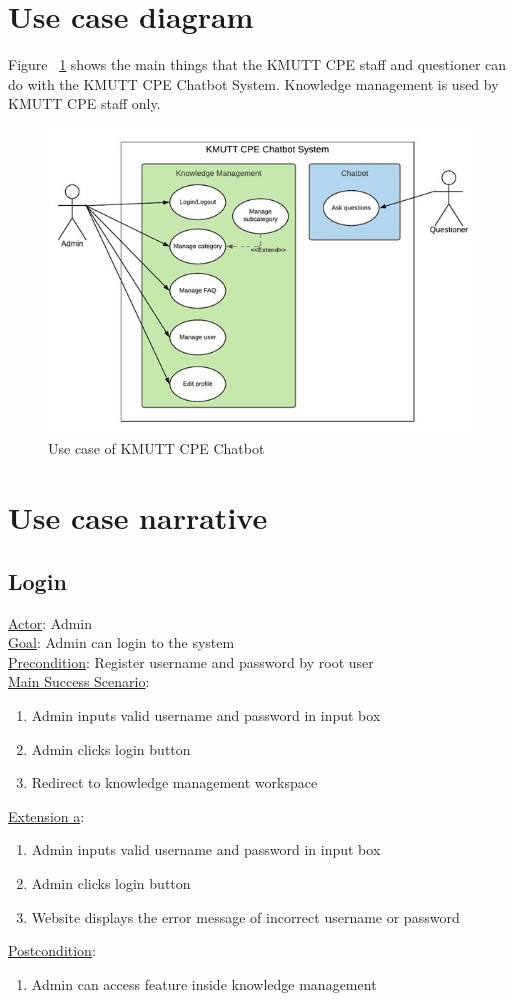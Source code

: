 \documentclass[12pt,oneside,openright,a4paper]{cpe-english-project}
\begin{document}
\section{Use case diagram}
Figure ~\ref*{fig:use case diagram} shows the main things that the KMUTT CPE staff and questioner can do with the KMUTT CPE Chatbot System. Knowledge management is used by KMUTT CPE staff only.
\begin{figure}[!h]
	\includegraphics[width=14cm]{img/ch3/use case diagram.jpg}
	\caption{Use case of KMUTT CPE Chatbot}\label{fig:use case diagram}
\end{figure}

\section{Use case narrative}
\subsection{Login}
\underline{Actor}: Admin\\
\underline{Goal}: Admin can login to the system\\
\underline{Precondition}: Register username and password by root user\\
\underline{Main Success Scenario}:
\begin{enumerate}[label={\arabic*.}]
	\item Admin inputs valid username and password in input box        
	\item Admin clicks login button
	\item Redirect to knowledge management workspace
\end{enumerate}
\underline{Extension a}:
\begin{enumerate}[label={\arabic*.}]
	\item Admin inputs valid username and password in input box        
	\item Admin clicks login button
	\item Website displays the error message of incorrect username or password
\end{enumerate}
\underline{Postcondition}: 
\begin{enumerate}[label={\arabic*.}]
	\item Admin can access feature inside knowledge management
\end{enumerate}
\end{document}
